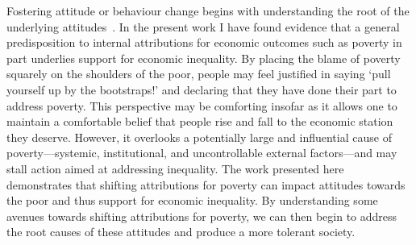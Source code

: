 \documentclass{sfuthesis}
\begin{document}
Fostering attitude or behaviour change begins with understanding the root of the underlying attitudes~\cite{weiner85}. In the present work I have found evidence that a general predisposition to internal attributions for economic outcomes such as poverty in part underlies support for economic inequality. By placing the blame of poverty squarely on the shoulders of the poor, people may feel justified in saying ‘pull yourself up by the bootstraps!’ and declaring that they have done their part to address poverty. This perspective may be comforting insofar as it allows one to maintain a comfortable belief that people rise and fall to the economic station they deserve. However, it overlooks a potentially large and influential cause of poverty—systemic, institutional, and uncontrollable external factors—and may stall action aimed at addressing inequality. The work presented here demonstrates that shifting attributions for poverty can impact attitudes towards the poor and thus support for economic inequality. By understanding some avenues towards shifting attributions for poverty, we can then begin to address the root causes of these attitudes and produce a more tolerant society. 


%
%
%
%
%

\backmatter%
	
	
	
\end{document}
